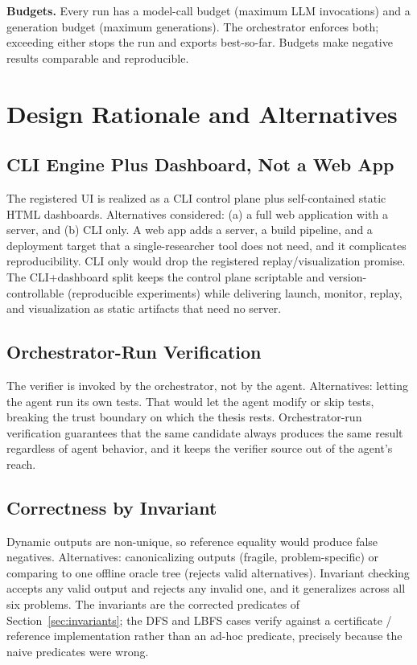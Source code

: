 \documentclass[12pt,a4paper]{article}
\begin{document}
\textbf{Budgets.} Every run has a model-call budget (maximum LLM invocations) and a generation budget (maximum generations). The orchestrator enforces both; exceeding either stops the run and exports best-so-far. Budgets make negative results comparable and reproducible.

\section{Design Rationale and Alternatives}
\label{sec:rationale}

\subsection{CLI Engine Plus Dashboard, Not a Web App}

The registered UI is realized as a CLI control plane plus self-contained static HTML dashboards. Alternatives considered: (a) a full web application with a server, and (b) CLI only. A web app adds a server, a build pipeline, and a deployment target that a single-researcher tool does not need, and it complicates reproducibility. CLI only would drop the registered replay/visualization promise. The CLI+dashboard split keeps the control plane scriptable and version-controllable (reproducible experiments) while delivering launch, monitor, replay, and visualization as static artifacts that need no server.

\subsection{Orchestrator-Run Verification}

The verifier is invoked by the orchestrator, not by the agent. Alternatives: letting the agent run its own tests. That would let the agent modify or skip tests, breaking the trust boundary on which the thesis rests. Orchestrator-run verification guarantees that the same candidate always produces the same result regardless of agent behavior, and it keeps the verifier source out of the agent's reach.

\subsection{Correctness by Invariant}

Dynamic outputs are non-unique, so reference equality would produce false negatives. Alternatives: canonicalizing outputs (fragile, problem-specific) or comparing to one offline oracle tree (rejects valid alternatives). Invariant checking accepts any valid output and rejects any invalid one, and it generalizes across all six problems. The invariants are the corrected predicates of Section~\ref{sec:invariants}; the DFS and LBFS cases verify against a certificate / reference implementation rather than an ad-hoc predicate, precisely because the naive predicates were wrong.
\end{document}
